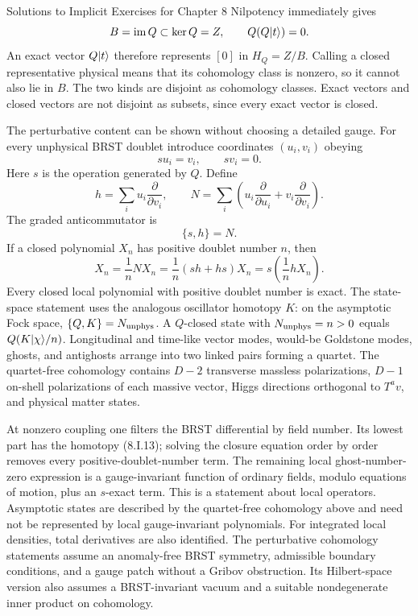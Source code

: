 \begin{bankssolutions}{Solutions to Implicit Exercises for Chapter 8}
Nilpotency immediately gives
\[
 B=\operatorname{im}Q\subset\ker Q=Z,
 \qquad Q(Q\lvert t\rangle)=0.
\]
An exact vector $Q\lvert t\rangle$ therefore represents $[0]$ in $H_Q=Z/B$.
Calling a closed representative physical means that its cohomology class is
nonzero, so it cannot also lie in $B$.  The two kinds are disjoint as
cohomology classes.  Exact vectors and closed vectors are not disjoint as
subsets, since every exact vector is closed.

The perturbative content can be shown without choosing a detailed gauge.
For every unphysical BRST doublet introduce coordinates $(u_i,v_i)$ obeying
\[
 su_i=v_i,\qquad sv_i=0.
\]
Here $s$ is the operation generated by $Q$.  Define
\[
 h=\sum_i u_i\frac{\partial}{\partial v_i},
 \qquad N=\sum_i\left(u_i\frac{\partial}{\partial u_i}
 +v_i\frac{\partial}{\partial v_i}\right).
\]
The graded anticommutator is
\[
 \{s,h\}=N. \tag{8.I.13}
\]
If a closed polynomial $X_n$ has positive doublet number $n$, then
\[
 X_n=\frac1nNX_n=\frac1n(sh+hs)X_n
 =s\left(\frac1nhX_n\right).
 \tag{8.I.14}
\]
Every closed local polynomial with positive doublet number is exact.  The
state-space statement uses the analogous oscillator homotopy $K$: on the
asymptotic Fock space, $\{Q,K\}=N_{\rm unphys}$.  A $Q$-closed state with
$N_{\rm unphys}=n>0$ equals $Q(K\lvert \chi\rangle/n)$.  Longitudinal and time-like
vector modes, would-be Goldstone modes, ghosts, and antighosts arrange into
two linked pairs forming a quartet.  The quartet-free cohomology contains
$D-2$ transverse massless polarizations, $D-1$ on-shell polarizations of each
massive vector, Higgs directions orthogonal to $T^av$, and physical matter
states.

At nonzero coupling one filters the BRST differential by field number.  Its
lowest part has the homotopy (8.I.13); solving the closure equation order by
order removes every positive-doublet-number term.  The remaining local
ghost-number-zero expression is a gauge-invariant function of ordinary
fields, modulo equations of motion, plus an $s$-exact
term.  This is a statement about local operators.  Asymptotic states are
described by the quartet-free cohomology above and need not be represented by
local gauge-invariant polynomials.  For integrated local densities, total
derivatives are also identified.  The perturbative cohomology statements
assume an anomaly-free
BRST symmetry, admissible boundary conditions, and a gauge patch without a
Gribov obstruction.  Its Hilbert-space version also assumes a BRST-invariant
vacuum and a suitable nondegenerate inner product on cohomology.


\end{bankssolutions}
